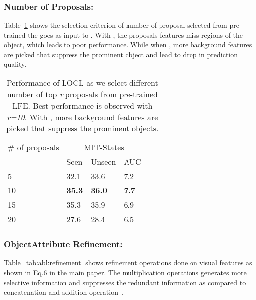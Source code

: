 \documentclass{bmvc2k}
\newcommand{\tablelightgray}{\rowcolor[gray]{.95}}
\begin{document}
\subsubsection{Number of Proposals:}
Table~\ref{tab:abl:num_prop} shows the selection criterion of number of proposal selected from pre-trained  the goes as input to . With , the proposals features miss regions of the object, which leads to poor performance. While when , more background features are picked that suppress the prominent object and lead to drop in prediction quality.

\begin{table}[h]
\centering
\begin{tabular}{l|lllll}
\# of proposals & \multicolumn{3}{c}{MIT-States}               \\ 
               & Seen          & Unseen         & AUC          \\ \hline
\tablelightgray
5              & 32.1         & 33.6          & 7.2          \\
10             & \textbf{35.3} & \textbf{36.0} & \textbf{7.7} \\
\tablelightgray
15             & 35.3         & 35.9          & 6.9          \\
20             & 27.6         & 28.4          & 6.5          \\ \hline
\end{tabular}
\vspace{0.1cm}
\caption{Performance of LOCL as we select different number of top \textit{r} proposals from pre-trained LFE. Best performance is observed with \textit{r=10}. With , more background features are picked that suppress the prominent objects.}
\label{tab:abl:num_prop}
\end{table}

\subsubsection{ObjectAttribute Refinement:}
Table~\ref{tab:abl:refinement} shows refinement operations done on visual features  as shown in Eq.6 in the main paper. The multiplication operations generates more selective information and suppresses the redundant information as compared to concatenation and addition operation~\cite{ulutan2020vsgnet,iftekhar2021gtnet}.
\end{document}

